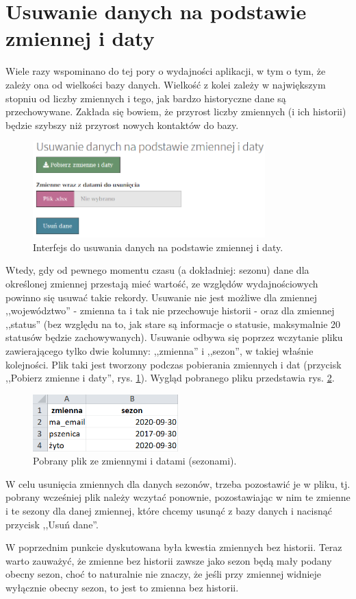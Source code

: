 \documentclass[12pt, twoside, hidelinks]{report}
\begin{document}
\section{Usuwanie danych na podstawie zmiennej i daty}
Wiele razy wspominano do tej pory o wydajności aplikacji, w tym o tym, że zależy ona od wielkości bazy danych. Wielkość z kolei zależy w największym stopniu od liczby zmiennych i tego, jak bardzo historyczne dane są przechowywane. Zakłada się bowiem, że przyrost liczby zmiennych (i ich historii) będzie szybszy niż przyrost nowych kontaktów do bazy. \par
 \begin{figure}[h!]
\includegraphics[width = 0.8\textwidth]{3.5.}
\centering
\caption{Interfejs do usuwania danych na podstawie zmiennej i daty.}
\label{usuwanie_danych_na_podstawie_zmiennej_daty_interfejs}
\end{figure}
Wtedy, gdy od pewnego momentu czasu (a dokładniej: sezonu) dane dla określonej zmiennej przestają mieć wartość, ze względów wydajnościowych powinno się usuwać takie rekordy. Usuwanie nie jest możliwe dla zmiennej ,,województwo'' - zmienna ta i tak nie przechowuje historii - oraz dla zmiennej ,,status'' (bez względu na to, jak stare są informacje o statusie, maksymalnie 20 statusów będzie zachowywanych). Usuwanie odbywa się poprzez wczytanie pliku zawierającego tylko dwie kolumny: ,,zmienna'' i ,,sezon'', w takiej właśnie kolejności. Plik taki jest tworzony podczas pobierania zmiennych i dat (przycisk ,,Pobierz zmienne i daty'', rys. \ref{usuwanie_danych_na_podstawie_zmiennej_daty_interfejs}). Wygląd pobranego pliku przedstawia rys. \ref{pobrany_plik_usuwanie_danych_na_podstawie_zmiennej_daty}. \par
 \begin{figure}[h!]
\includegraphics[width = 0.5\textwidth]{3.6.}
\centering
\caption{Pobrany plik ze zmiennymi i datami (sezonami).}
\label{pobrany_plik_usuwanie_danych_na_podstawie_zmiennej_daty}
\end{figure}
W celu usunięcia zmiennych dla danych sezonów, trzeba pozostawić je w pliku, tj. pobrany wcześniej plik należy wczytać ponownie, pozostawiając w nim te zmienne i te sezony dla danej zmiennej, które chcemy usunąć z bazy danych i nacisnąć przycisk ,,Usuń dane''. \par
W poprzednim punkcie dyskutowana była kwestia zmiennych bez historii. Teraz warto zauważyć, że zmienne bez historii zawsze jako sezon będą mały podany obecny sezon, choć to naturalnie nie znaczy, że jeśli przy zmiennej widnieje wyłącznie obecny sezon, to jest to zmienna bez historii.
\end{document}
